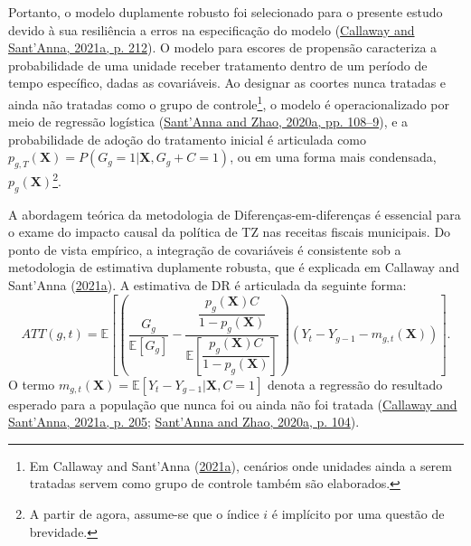 \documentclass[12pt, a4paper, twoside]{article}
\numberwithin{equation}{subsection} %
\begin{document}
Portanto, o modelo duplamente robusto foi selecionado para o presente
estudo devido à sua resiliência a erros na especificação do modelo
(\protect\hyperlink{ref-CALLAWAY2021200}{Callaway and Sant'Anna, 2021a,
p. 212}). O modelo para escores de propensão caracteriza a probabilidade
de uma unidade receber tratamento dentro de um período de tempo
específico, dadas as covariáveis. Ao designar as coortes nunca tratadas
e ainda não tratadas como o grupo de controle\footnote{Em Callaway and
  Sant'Anna (\protect\hyperlink{ref-CALLAWAY2021200}{2021a}), cenários
  onde unidades ainda a serem tratadas servem como grupo de controle
  também são elaborados.}, o modelo é operacionalizado por meio de
regressão logística (\protect\hyperlink{ref-SANTANNA2020101}{Sant'Anna
and Zhao, 2020a, pp. 108--9}), e a probabilidade de adoção do tratamento
inicial é articulada como
\(p_{g,T}(\boldsymbol{X}) = P(G_g=1 | \boldsymbol{X}, G_g + C = 1)\), ou
em uma forma mais condensada, \(p_{g}(\boldsymbol{X})\)\footnote{A
  partir de agora, assume-se que o índice \(i\) é implícito por uma
  questão de brevidade.}.

A abordagem teórica da metodologia de Diferenças-em-diferenças é
essencial para o exame do impacto causal da política de TZ nas receitas
fiscais municipais. Do ponto de vista empírico, a integração de
covariáveis \hspace{0pt}\hspace{0pt}é consistente sob a metodologia de
estimativa duplamente robusta, que é explicada em Callaway and Sant'Anna
(\protect\hyperlink{ref-CALLAWAY2021200}{2021a}). A estimativa de DR é
articulada da seguinte forma: \begin{equation}
\label{eq-dr-identification}
ATT(g, t) = \mathbb{E} \left[ \left(\frac{G_g}{\mathbb{E}[G_g]} - \dfrac{ \dfrac{p_g(\boldsymbol{X}) C}{1 - p_g(\boldsymbol{X})} }{\mathbb{E} \left[\dfrac{p_g(\boldsymbol{X}) C}{1 - p_g(\boldsymbol{X})} \right]} \right) (Y_t - Y_{g-1} - m_{g,t}(\boldsymbol{X}) ) \right].
\end{equation} O termo
\(m_{g,t}(\boldsymbol{X}) = \mathbb{E}[Y_t - Y_{g-1}|\boldsymbol{X}, C = 1]\)
denota a regressão do resultado esperado para a população que nunca foi
ou ainda não foi tratada
(\protect\hyperlink{ref-CALLAWAY2021200}{Callaway and Sant'Anna, 2021a,
p. 205}; \protect\hyperlink{ref-SANTANNA2020101}{Sant'Anna and Zhao,
2020a, p. 104}).
\end{document}
